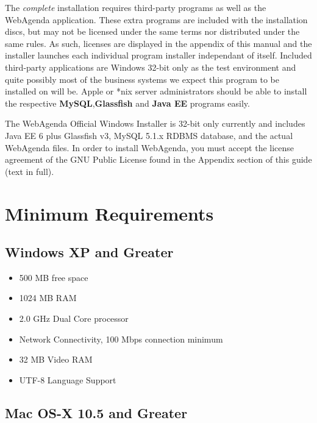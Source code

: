\documentclass[a4paper,10pt]{report}
\begin{document}
\par \noindent \hspace*{1cm} The \textit{complete} installation requires third-party programs as well as the WebAgenda application. These extra programs are included with the installation discs, but may not be licensed under the same terms nor distributed under the same rules. As such, licenses are displayed in the appendix of this manual and the installer launches each individual program installer independant of itself. Included third-party applications are Windows 32-bit only as the test environment and quite possibly most of the business systems we expect this program to be installed on will be. Apple or *nix server administrators should be able to install the respective \textbf{MySQL},\textbf{Glassfish} and \textbf{Java EE} programs easily. 
\bigskip
\par \noindent \hspace*{1cm} The WebAgenda Official Windows Installer is 32-bit only currently and includes Java EE 6 plus Glassfish v3, MySQL 5.1.x RDBMS database, and the actual WebAgenda files. In order to install WebAgenda, you must accept the license agreement of the GNU Public License found in the Appendix section of this guide (text in full).

\section{Minimum Requirements}
\subsection*{Windows XP and Greater}
\begin{itemize}
 \item 500 MB free space 
 \item 1024 MB RAM
 \item 2.0 GHz Dual Core processor
 \item Network Connectivity, 100 Mbps connection minimum
 \item 32 MB Video RAM
 \item UTF-8 Language Support
\end{itemize}

\subsection*{Mac OS-X 10.5 and Greater}

\end{document}
